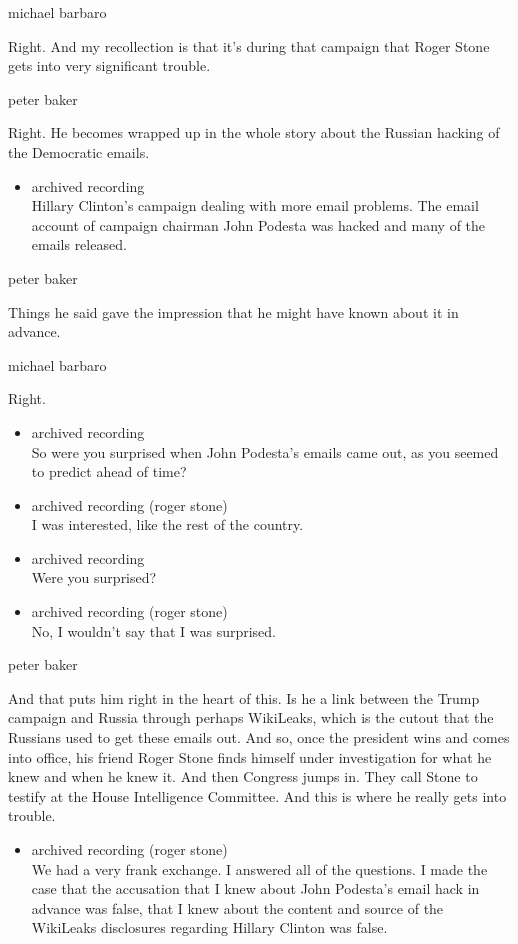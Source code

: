 michael barbaro

Right. And my recollection is that it's during that campaign that Roger
Stone gets into very significant trouble.

peter baker

Right. He becomes wrapped up in the whole story about the Russian
hacking of the Democratic emails.

\begin{itemize}
\tightlist
\item
  archived recording\\
  Hillary Clinton's campaign dealing with more email problems. The email
  account of campaign chairman John Podesta was hacked and many of the
  emails released.
\end{itemize}

peter baker

Things he said gave the impression that he might have known about it in
advance.

michael barbaro

Right.

\begin{itemize}
\item
  archived recording\\
  So were you surprised when John Podesta's emails came out, as you
  seemed to predict ahead of time?
\item
  archived recording (roger stone)\\
  I was interested, like the rest of the country.
\item
  archived recording\\
  Were you surprised?
\item
  archived recording (roger stone)\\
  No, I wouldn't say that I was surprised.
\end{itemize}

peter baker

And that puts him right in the heart of this. Is he a link between the
Trump campaign and Russia through perhaps WikiLeaks, which is the cutout
that the Russians used to get these emails out. And so, once the
president wins and comes into office, his friend Roger Stone finds
himself under investigation for what he knew and when he knew it. And
then Congress jumps in. They call Stone to testify at the House
Intelligence Committee. And this is where he really gets into trouble.

\begin{itemize}
\tightlist
\item
  archived recording (roger stone)\\
  We had a very frank exchange. I answered all of the questions. I made
  the case that the accusation that I knew about John Podesta's email
  hack in advance was false, that I knew about the content and source of
  the WikiLeaks disclosures regarding Hillary Clinton was false.
\end{itemize}

